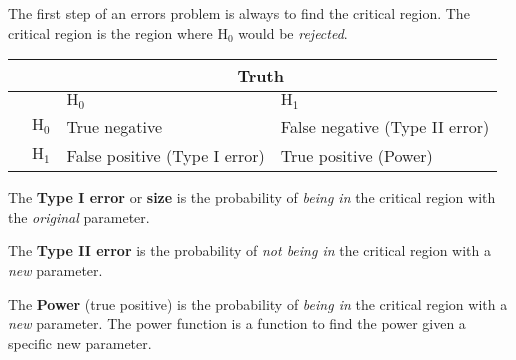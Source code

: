 \documentclass[../main.tex]{subfile}
\begin{document}

The first step of an errors problem is always to find the critical region. The critical region is the region where $\text{H}_0$ would be \textit{rejected}.

\begin{center}
\large
\begin{tabular}{|c|c|l|l|}
	\hline
	\phantom{} & \multicolumn{3}{c|}{Truth}\\
	\hline
	\multirow{3}{*}{\rotatebox[origin=c]{90}{Conc.}} & & $\text{H}_0$ & $\text{H}_1$ \\
	\cline{2-4}
	& $\text{H}_0$ & True negative & False negative (Type II error)\\
	\cline{2-4}
	& $\text{H}_1$ & False positive (Type I error) & True positive (Power)\\
	\hline
\end{tabular}
\end{center}

The \textbf{Type I error} or \textbf{size} is the probability of \textit{being in} the critical region with the \textit{original} parameter.

The \textbf{Type II error} is the probability of \textit{not being in} the critical region with a \textit{new} parameter.

The \textbf{Power} (true positive) is the probability of \textit{being in} the critical region with a \textit{new} parameter. The power function is a function to find the power given a specific new parameter.
\end{document}
